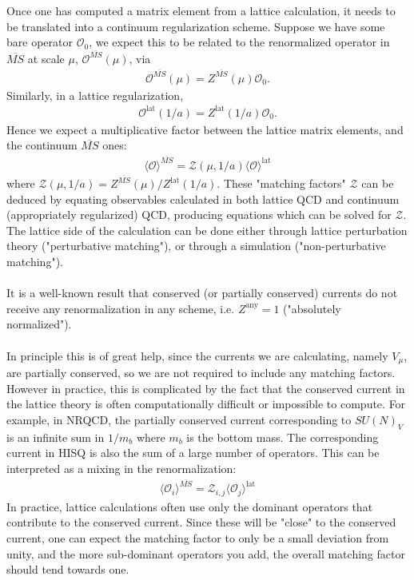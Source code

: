 \documentclass[a4paper,10pt]{article}
\numberwithin{equation}{section}
\begin{document}
Once one has computed a matrix element from a lattice calculation, it needs to be translated into a continuum regularization scheme. Suppose we have some bare operator $\mathcal{O}_0$, we expect this to be related to the renormalized operator in $\overline{MS}$ at scale $\mu$, $\mathcal{O}^{\overline{MS}}(\mu)$, via
\begin{align}
	\mathcal{O}^{\overline{MS}}(\mu) = Z^{\overline{MS}}(\mu) \mathcal{O}_0.
\end{align}
Similarly, in a lattice regularization,
\begin{align}
	\mathcal{O}^{\text{lat}}(1/a) = Z^{\text{lat}}(1/a) \mathcal{O}_0.
\end{align}
Hence we expect a multiplicative factor between the lattice matrix elements, and the continuum $\overline{MS}$ ones:
\begin{align}
	\langle \mathcal{O} \rangle^{\overline{MS}} = \mathcal{Z}(\mu,1/a) \langle \mathcal{O} \rangle^{\text{lat}}
\end{align}
where $\mathcal{Z}(\mu,1/a) = Z^{\overline{MS}}(\mu)/Z^{\text{lat}}(1/a)$. These "matching factors" $\mathcal{Z}$ can be deduced by equating observables calculated in both lattice QCD and continuum (appropriately regularized) QCD, producing equations which can be solved for $\mathcal{Z}$. The lattice side of the calculation can be done either through lattice perturbation theory ("perturbative matching"), or through a simulation ("non-perturbative matching").
\\ \\
It is a well-known result that conserved (or partially conserved) currents do not receive any renormalization in any scheme, i.e. $Z^{\text{any}}=1$ ("absolutely normalized").
\\ \\
In principle this is of great help, since the currents we are calculating, namely $V_{\mu}$, are partially conserved, so we are not required to include any matching factors. However in practice, this is complicated by the fact that the conserved current in the lattice theory is often computationally difficult or impossible to compute. For example, in NRQCD, the partially conserved current corresponding to $SU(N)_V$ is an infinite sum in $1/m_b$ where $m_b$ is the bottom mass. The corresponding current in HISQ is also the sum of a large number of operators. This can be interpreted as a mixing in the renormalization:
\begin{align}
	\langle \mathcal{O}_i \rangle^{\overline{MS}} = \mathcal{Z}_{i,j} \langle \mathcal{O}_j \rangle^{\text{lat}}
\end{align}
In practice, lattice calculations often use only the dominant operators that contribute to the conserved current. Since these will be "close" to the conserved current, one can expect the matching factor to only be a small deviation from unity, and the more sub-dominant operators you add, the overall matching factor should tend towards one.
\end{document}
